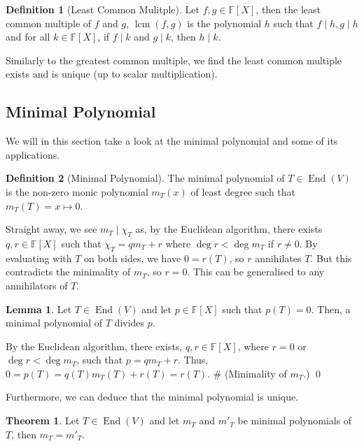 \documentclass[
]{article}
\theoremstyle{definition}
\newtheorem{theorem}{Theorem}
\newtheorem{lemma}{Lemma}[section]
\theoremstyle{definition}
\newtheorem{definition}{Definition}[section]
\begin{document}
\begin{definition}[Least Common Mulitple]
  Let \(f, g \in \mathbb{F}[X]\), then the least common multiple of \(f\) and 
  \(g\), \(\mathop{\mathrm{lcm}}(f, g)\) is the polynomial \(h\) such that \(f \mid h, g \mid h\) 
  and for all \(k \in \mathbb{F}[X]\), if \(f \mid k\) and \(g \mid k\), then 
  \(h \mid k\).
\end{definition}

Similarly to the greatest common multiple, we find the least common
multiple exists and is unique (up to scalar multiplication).

\hypertarget{minimal-polynomial}{%
\subsection{Minimal Polynomial}\label{minimal-polynomial}}

We will in this section take a look at the minimal polynomial and some
of its applications.

\begin{definition}[Minimal Polynomial]
  The minimal polynomial of \(T \in \mathop{\mathrm{End}}(V)\) is the non-zero monic polynomial 
  \(m_T(x)\) of least degree such that \(m_T(T) = x \mapsto 0\).
\end{definition}

Straight away, we see \(m_T \mid \chi_T\) as, by the Euclidean
algorithm, there exists \(q, r \in \mathbb{F}[X]\) such that
\(\chi_T = q m_T + r\) where \(\deg r < \deg m_T\) if \(r \neq 0\). By
evaluating with \(T\) on both sides, we have \(0 = r(T)\), so \(r\)
annihilates \(T\). But this contradicts the minimality of \(m_T\), so
\(r = 0\). This can be generalised to any annihilators of \(T\).

\begin{lemma}
  Let \(T \in \mathop{\mathrm{End}}(V)\) and let \(p \in \mathbb{F}[X]\) such that \(p(T) = 0\). 
  Then, a minimal polynomial of \(T\) divides \(p\). 
\end{lemma}
\proof

By the Euclidean algorithm, there exists, \(q, r \in \mathbb{F}[X]\),
where \(r = 0\) or \(\deg r < \deg m_T\), such that \(p = qm_T + r\).
Thus, \(0 = p(T) = q(T) m_T(T) + r(T) = r(T)\). \# (Minimality of
\(m_T\).) \qed

Furthermore, we can deduce that the minimal polynomial is unique.

\begin{theorem}
  Let \(T \in \mathop{\mathrm{End}}(V)\) and let \(m_T\) and \(m'_T\) be minimal polynomials of 
  \(T\), then \(m_T = m'_T\).
\end{theorem}
\proof
\end{document}
